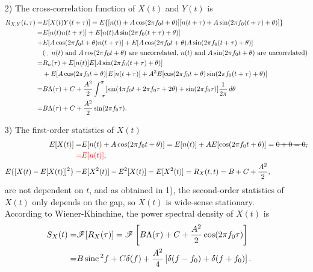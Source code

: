 \documentclass{assignment}
\begin{document}
\begin{sol}
\begin{itemize}
\begin{align}
        \end{align}
        \item[2)] The cross-correlation function of $X(t)$ and $Y(t)$ is
        \begin{align}
            \notag R_{X,Y}(t,\tau)=&E[X(t)Y(t+\tau)]=E\{[n(t)+A\cos(2\pi f_0t+\theta)][n(t+\tau)+A\sin(2\pi f_0(t+\tau)+\theta)]\}\\
            \notag=&E[n(t)n(t+\tau)]+E[n(t)A\sin(2\pi f_0(t+\tau)+\theta)]\\
            \notag+&E[A\cos(2\pi f_0t+\theta)n(t+\tau)]+E[A\cos(2\pi f_0t+\theta)A\sin(2\pi f_0(t+\tau)+\theta)]\\
            \notag&(\because n(t)\text{ and }A\cos(2\pi f_0t+\theta)\text{ are uncorrelated, }n(t)\text{ and }A\sin(2\pi f_0t+\theta)\text{ are uncorrelated})\\
            \notag=&R_n(\tau)+E[n(t)]E[A\sin(2\pi f_0(t+\tau)+\theta)]\\
            \notag&+E[A\cos(2\pi f_0t+\theta)]E[n(t+\tau)]+A^2E[\cos(2\pi f_0t+\theta)\sin(2\pi f_0(t+\tau)+\theta)]\\
            \notag=&B\Lambda(\tau)+C+\frac{A^2}{2}\int_{-\pi}^{\pi}[\sin(4\pi f_0t+2\pi f_0\tau+2\theta)+\sin(2\pi f_0\tau)]\frac{1}{2\pi}\,d\theta\\
            =&B\Lambda(\tau)+C+\frac{A^2}{2}\sin(2\pi f_0\tau).
        \end{align}
        \item[3)] The first-order statistics of $X(t)$
        \begin{align}
            \notag E[X(t)]=&E[n(t)+A\cos(2\pi f_0t+\theta)]=E[n(t)]+AE[\cos(2\pi f_0t+\theta)]=\text{\sout{$0+0=0,$}}\\
            {\color{red}=}&{\color{red}E[n(t)]},\\
            E\{[X(t)-E[X(t)]]^2\}=&E[X^2(t)]-E^2[X(t)]=E[X^2(t)]=R_X(t,t)=B+C+\frac{A^2}{2},
        \end{align}
        are not dependent on $t$, and as obtained in 1), the second-order statistics of $X(t)$ only depends on the gap, so $X(t)$ is wide-sense stationary. According to Wiener-Khinchine, the power spectral density of $X(t)$ is
        \begin{align}
            \notag S_X(t)=&\mathscr{F}[R_X(\tau)]=\mathscr{F}\left[B\Lambda(\tau)+C+\frac{A^2}{2}\cos(2\pi f_0\tau)\right]\\
            =&B\,\text{sinc}\,^2f+C\delta(f)+\frac{A^2}{4}\left[\delta(f-f_0)+\delta(f+f_0)\right].
        \end{align}

\end{itemize}
\end{sol}
\end{document}
